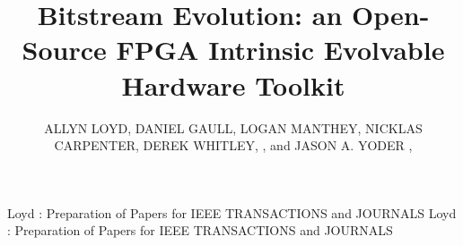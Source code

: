 \documentclass{ieeeaccess}
\begin{document}

\title{Bitstream Evolution: an Open-Source FPGA Intrinsic Evolvable Hardware Toolkit}
\author{\uppercase{Allyn Loyd}, 
\uppercase{Daniel Gaull}, 
\uppercase{Logan Manthey},
\uppercase{ Nicklas Carpenter},
\uppercase{ Derek Whitley},
, and
\uppercase{  Jason A. Yoder}
,
}

\address[1]{Rose-Hulman Institute of Technology, Terre Haute, IN 47803 USA}
\address[2]{ University of Houston, Houston, TX 77204 USA}
\address[3]{Tesla, Inc. Austin, TX 78725 USA}
\address[4]{Vivum AI, Bloomington, IN, 47401 USA}
\address[5]{University of Arizona, Tucson, Arizona 85721 USA}


\markboth
{Loyd \headeretal: Preparation of Papers for IEEE TRANSACTIONS and JOURNALS}
{Loyd \headeretal: Preparation of Papers for IEEE TRANSACTIONS and JOURNALS}


\end{document}
